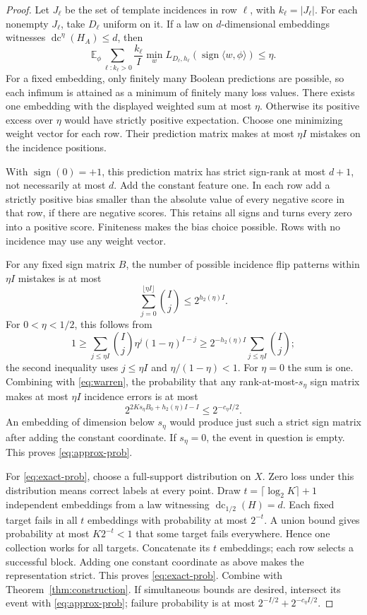 \documentclass[11pt]{article}
\DeclareMathOperator{\dc}{dc}
\DeclareMathOperator{\sign}{sign}
\newcommand{\E}{\mathbb E}
\newcommand{\1}{\mathbf 1}
\begin{document}
\begin{proof}
Let $J_\ell$ be the set of template incidences in row $\ell$, with $k_\ell=|J_\ell|$. For each nonempty $J_\ell$, take $D_\ell$ uniform on it. If a law on $d$-dimensional embeddings witnesses $\dc^\eta(H_A)\le d$, then
\[
 \E_\phi\sum_{\ell:k_\ell>0}\frac{k_\ell}{I}
       \min_w L_{D_\ell,h_\ell}(\sign\langle w,\phi\rangle)\le\eta.
\]
For a fixed embedding, only finitely many Boolean predictions are possible, so each infimum is attained as a minimum of finitely many loss values. There exists one embedding with the displayed weighted sum at most $\eta$. Otherwise its positive excess over $\eta$ would have strictly positive expectation. Choose one minimizing weight vector for each row. Their prediction matrix makes at most $\eta I$ mistakes on the incidence positions.

With $\sign(0)=+1$, this prediction matrix has strict sign-rank at most $d+1$, not necessarily at most $d$. Add the constant feature one. In each row add a strictly positive bias smaller than the absolute value of every negative score in that row, if there are negative scores. This retains all signs and turns every zero into a positive score. Finiteness makes the bias choice possible. Rows with no incidence may use any weight vector.

For any fixed sign matrix $B$, the number of possible incidence flip patterns within $\eta I$ mistakes is at most
\[
 \sum_{j=0}^{\lfloor\eta I\rfloor}\binom Ij\le2^{h_2(\eta)I}.
\]
For $0<\eta<1/2$, this follows from
\[
 1\ge\sum_{j\le\eta I}\binom Ij\eta^j(1-\eta)^{I-j}
 \ge2^{-h_2(\eta)I}\sum_{j\le\eta I}\binom Ij;
\]
the second inequality uses $j\le\eta I$ and $\eta/(1-\eta)<1$. For $\eta=0$ the sum is one. Combining with \eqref{eq:warren}, the probability that any rank-at-most-$s_\eta$ sign matrix makes at most $\eta I$ incidence errors is at most
\[
 2^{2Ks_\eta B_0+h_2(\eta)I-I}\le2^{-c_\eta I/2}.
\]
An embedding of dimension below $s_\eta$ would produce just such a strict sign matrix after adding the constant coordinate. If $s_\eta=0$, the event in question is empty. This proves \eqref{eq:approx-prob}.

For \eqref{eq:exact-prob}, choose a full-support distribution on $X$. Zero loss under this distribution means correct labels at every point. Draw $t=\lceil\log_2K\rceil+1$ independent embeddings from a law witnessing $\dc_{1/2}(H)=d$. Each fixed target fails in all $t$ embeddings with probability at most $2^{-t}$. A union bound gives probability at most $K2^{-t}<1$ that some target fails everywhere. Hence one collection works for all targets. Concatenate its $t$ embeddings; each row selects a successful block. Adding one constant coordinate as above makes the representation strict. This proves \eqref{eq:exact-prob}. Combine with Theorem~\ref{thm:construction}. If simultaneous bounds are desired, intersect its event with \eqref{eq:approx-prob}; failure probability is at most $2^{-I/2}+2^{-c_\eta I/2}$.
\end{proof}
\end{document}
